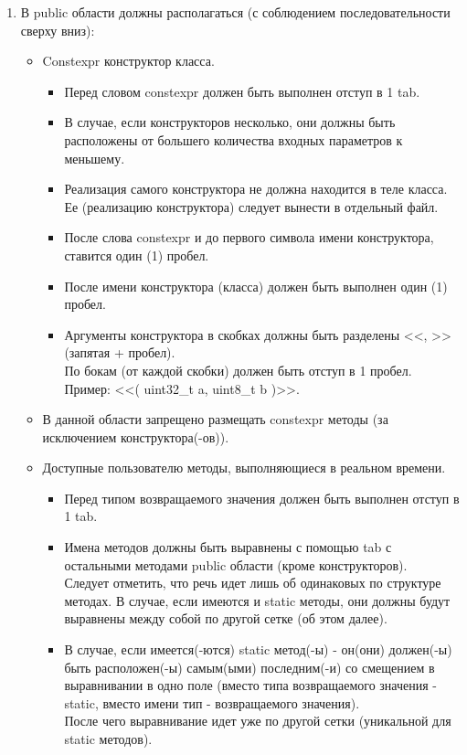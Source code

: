 \begin{enumerate}
	\item В public области должны располагаться (с соблюдением последовательности сверху вниз):
	\begin{itemize}
		\item Constexpr конструктор класса.
		\begin{itemize}
			\item Перед словом constexpr должен быть выполнен отступ в 1 tab.
			\item В случае, если конструкторов несколько, они должны быть расположены от большего количества входных параметров к меньшему.
			\item Реализация самого конструктора не должна находится в теле класса. Ее (реализацию конструктора) следует вынести в отдельный файл.
			\item После слова constexpr и до первого символа имени конструктора, ставится один (1) пробел.
			\item После имени конструктора (класса) должен быть выполнен один (1) пробел. 
			\item Аргументы конструктора в скобках должны быть разделены <<, >> (запятая + пробел).\\По бокам (от каждой скобки) должен быть отступ в 1 пробел.\\Пример: <<( uint32\_t a, uint8\_t b )>>.
		\end{itemize}
		\item В данной области запрещено размещать constexpr методы (за исключением кон\-струк\-то\-ра\-(-ов)).
		\item Доступные пользователю методы, выполняющиеся в реальном времени.
		\begin{itemize}
			\item Перед типом возвращаемого значения должен быть выполнен отступ в 1 tab.
			\item Имена методов должны быть выравнены с помощью tab с остальными методами public области (кроме конструкторов).\\Следует отметить, что речь идет лишь об одинаковых по структуре методах. В случае, если имеются и static методы, они должны будут выравнены между собой по другой сетке (об этом далее).
			\item В случае, если имеется(-ются) static метод(-ы) - он(они) должен(-ы) быть расположен(-ы) самым(ыми) последним(-и) со смещением в выравнивании в одно поле (вместо типа возвращаемого значения - static, вместо имени тип - возвращаемого значения).\\После чего выравнивание идет уже по другой сетки (уникальной для static методов).

\end{itemize}
\end{itemize}
\end{enumerate}
